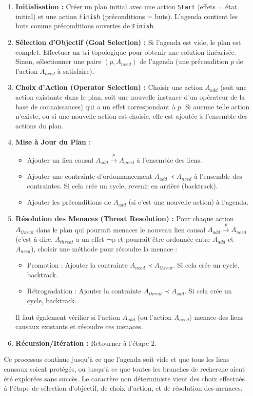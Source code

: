 \documentclass[a4paper,12pt]{report}
\begin{document}
\begin{enumerate}
    \item \textbf{Initialisation :} Créer un plan initial avec une action \texttt{Start} (effets = état initial) et une action \texttt{Finish} (préconditions = buts). L'agenda contient les buts comme préconditions ouvertes de \texttt{Finish}.
    \item \textbf{Sélection d'Objectif (Goal Selection) :} Si l'agenda est vide, le plan est complet. Effectuer un tri topologique pour obtenir une solution linéarisée. Sinon, sélectionner une paire \((p, A_{need})\) de l'agenda (une précondition \(p\) de l'action \(A_{need}\) à satisfaire).
    \item \textbf{Choix d'Action (Operator Selection) :} Choisir une action \(A_{add}\) (soit une action existante dans le plan, soit une nouvelle instance d'un opérateur de la base de connaissances) qui a un effet correspondant à \(p\). Si aucune telle action n'existe, ou si une nouvelle action est choisie, elle est ajoutée à l'ensemble des actions du plan.
    \item \textbf{Mise à Jour du Plan :}
        \begin{itemize}
            \item Ajouter un lien causal \(A_{add} \xrightarrow{p} A_{need}\) à l'ensemble des liens.
            \item Ajouter une contrainte d'ordonnancement \(A_{add} \prec A_{need}\) à l'ensemble des contraintes. Si cela crée un cycle, revenir en arrière (backtrack).
            \item Ajouter les préconditions de \(A_{add}\) (si c'est une nouvelle action) à l'agenda.
        \end{itemize}
    \item \textbf{Résolution des Menaces (Threat Resolution) :} Pour chaque action \(A_{threat}\) dans le plan qui pourrait menacer le nouveau lien causal \(A_{add} \xrightarrow{p} A_{need}\) (c'est-à-dire, \(A_{threat}\) a un effet ¬p et pourrait être ordonnée entre \(A_{add}\) et \(A_{need}\)), choisir une méthode pour résoudre la menace :
        \begin{itemize}
            \item Promotion : Ajouter la contrainte \(A_{need} \prec A_{threat}\). Si cela crée un cycle, backtrack.
            \item Rétrogradation : Ajouter la contrainte \(A_{threat} \prec A_{add}\). Si cela crée un cycle, backtrack.
        \end{itemize}
        Il faut également vérifier si l'action \(A_{add}\) (ou l'action \(A_{need}\)) menace des liens causaux existants et résoudre ces menaces.
    \item \textbf{Récursion/Itération :} Retourner à l'étape 2.
\end{enumerate}
Ce processus continue jusqu'à ce que l'agenda soit vide et que tous les liens causaux soient protégés, ou jusqu'à ce que toutes les branches de recherche aient été explorées sans succès. Le caractère non déterministe vient des choix effectués à l'étape de sélection d'objectif, de choix d'action, et de résolution des menaces.
\end{document}
